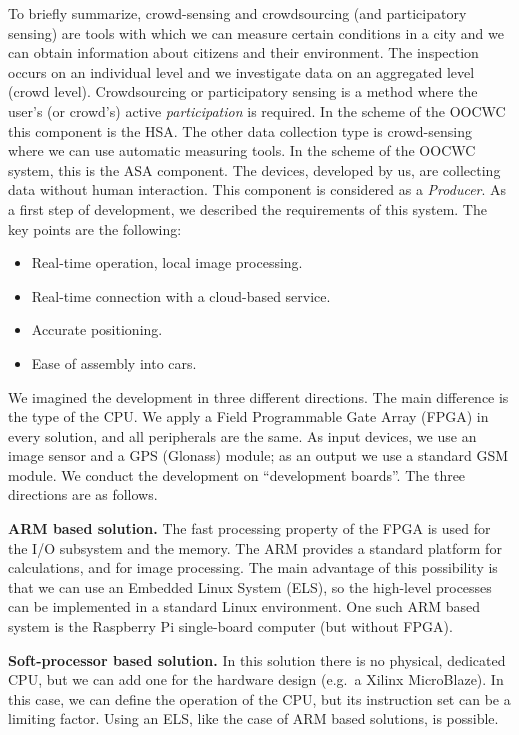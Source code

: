 \documentclass[b5paper,12pt]{report}
\theoremstyle{definition}
\begin{document}
To briefly summarize, crowd-sensing and crowdsourcing (and participatory sensing) are tools with which we can measure certain conditions in a city and we can obtain information about citizens and their environment. The inspection occurs on an individual level and we investigate data on an aggregated level (crowd level). Crowdsourcing or participatory sensing is a method where the user's (or crowd's) active \textit{participation} is required. In the scheme of the OOCWC this component is the HSA. The other data collection type is crowd-sensing where we can use automatic measuring tools. In the scheme of the OOCWC system, this is the ASA component. The devices, developed by us, are collecting data without human interaction. This component is considered as a \textit{Producer}. As a first step of development, we described the requirements of this system. The key points are the following:

\begin{itemize}
\item Real-time operation, local image processing.
\item Real-time connection with a cloud-based service.
\item Accurate positioning.
\item Ease of assembly into cars.
\end{itemize}

We imagined the development in three different directions. The main difference is the type of the CPU. We apply a Field Programmable Gate Array (FPGA) in every solution, and all peripherals are the same. As input devices, we use an image sensor and a GPS (Glonass) module; as an output we use a standard GSM module. We conduct the development on \enquote{development boards}. The three directions are as follows.

{\bf{ARM based solution.}} The fast processing property of the FPGA is used for the I/O subsystem and the memory. The ARM provides a standard platform for calculations, and for image processing. The main advantage of this possibility is that we can use an Embedded Linux System (ELS), so the high-level processes can be implemented in a standard Linux environment. One such ARM based system is the Raspberry Pi single-board computer (but without FPGA).

{\bf{Soft-processor based solution.}} In this solution there is no physical, dedicated CPU, but we can add one for the hardware design (e.g.~a Xilinx MicroBlaze). In this case, we can define the operation of the CPU, but its instruction set can be a limiting factor. Using an ELS, like the case of ARM based solutions, is possible.
\end{document}
